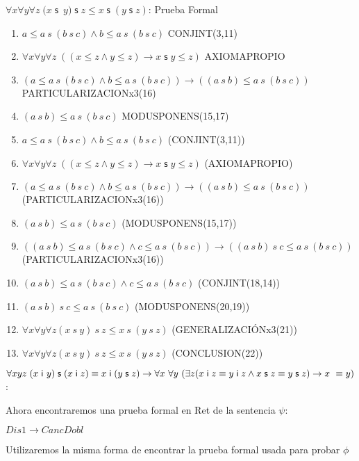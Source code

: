 \documentclass[10pt]{beamer}
\newcounter{saveenumi}
\newcommand{\seti}{\setcounter{saveenumi}{\value{enumi}}}
\newcommand{\conti}{\setcounter{enumi}{\value{saveenumi}}}
\newcommand{\Cfontb}{\fontsize{5.7}{9.5}\selectfont}
\newcommand{\Cfonti}{\fontsize{8.5}{7.2}\selectfont}
\newcommand{\Nand}{\wedge}
\newcommand{\sLesCot}{\forall x\forall y\forall z\;\left( (x\leq
z\wedge y\leq z)\rightarrow x\;\text{$\mathsf{s\;}$}y\leq z\right)}
\newcommand{\assoc}{\forall x\forall y\forall
z\;(x\;\mathsf{s}$\ $y)\;\mathsf{s}\;z\leq x\;\mathsf{s}\;(y\;\mathsf{s}\;z)}
\newcommand{\acot}{Dis1\rightarrow CancDobl}
\newcommand{\idistr}{\forall xyz\;(x\;\mathsf{i}\
y)\;\mathsf{s}\;(x\;\mathsf{i}\;z)\equiv x\;\mathsf{i}\;(y\;\mathsf{s}%
\;z)}
\newcommand{\myconj}{x\;\mathsf{i}\;z\equiv y\;\mathsf{%
i}\;z\wedge x\;\mathsf{s}\;z\equiv y\;\mathsf{s}\;z}
\begin{document}
\begin{frame}{$\assoc$: Prueba Formal}
\Cfontb

\begin{enumerate}[<+->]
  \conti
  \item $ a \leq a\ s\ (b\ s\ c) \Nand b \leq a\ s\ (b\ s\ c)$ \hfill CONJINT(3,11)
  \item $ \sLesCot $ \hfill AXIOMAPROPIO
  \item $ (a \leq a\ s\ (b\ s\ c) \Nand b \leq a\ s\ (b\ s\ c)) \rightarrow ((a\ s\ b) \leq a\ s\ (b\ s\ c)) $ \hfill PARTICULARIZACIONx3(16)
  \item $ (a\ s\ b) \leq a\ s\ (b\ s\ c)$ \hfill MODUSPONENS(15,17)

  \item $ a \leq a\ s\ (b\ s\ c) \Nand b \leq a\ s\ (b\ s\ c)$ \hfill(CONJINT(3,11))
  \item $ \sLesCot $ \hfill(AXIOMAPROPIO)
  \item $ (a \leq a\ s\ (b\ s\ c) \Nand b \leq a\ s\ (b\ s\ c)) \rightarrow ((a\ s\ b) \leq a\ s\ (b\ s\ c)) $ \hfill(PARTICULARIZACIONx3(16))
  \item $ (a\ s\ b) \leq a\ s\ (b\ s\ c)$ \hfill(MODUSPONENS(15,17))
  \item $ ((a\ s\ b) \leq a\ s\ (b\ s\ c) \Nand c \leq a\ s\ (b\ s\ c)) \rightarrow ((a\ s\ b)\ s\ c \leq a\ s\ (b\ s\ c)) $ \hfill(PARTICULARIZACIONx3(16))
  \item $ (a\ s\ b) \leq a\ s\ (b\ s\ c) \Nand c \leq a\ s\ (b\ s\ c) $ \hfill(CONJINT(18,14))
  \item $ (a\ s\ b)\ s\ c \leq a\ s\ (b\ s\ c) $ \hfill(MODUSPONENS(20,19))
  \item $ \forall x \forall y \forall z (x\ s\ y)\ s\ z \leq x\ s\ (y\ s\ z)$ \hfill(GENERALIZACIÓNx3(21))
  \item $ \forall x \forall y \forall z (x\ s\ y)\ s\ z \leq x\ s\ (y\ s\ z)$ \hfill(CONCLUSION(22))
  \seti
\end{enumerate}

\end{frame}



\begin{frame}{\Cfonti$\idistr \rightarrow \forall x\ \forall y\ (\exists z (\myconj) \rightarrow x\ \equiv y)$:}

  Ahora encontraremos una prueba formal en Ret de la sentencia $\psi$:
  \begin{center}
    $\acot$
  \end{center}
  \pause
  Utilizaremos la misma forma de encontrar la prueba formal usada para probar
  $\phi$

\end{frame}
\end{document}
